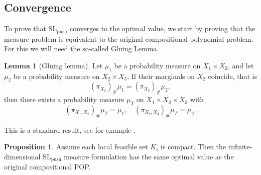 \documentclass[11pt,a4paper]{article}
\theoremstyle{definition}
\newtheorem{lemma}[theorem]{Lemma}
\newtheorem{proposition}[theorem]{Proposition}
\begin{document}
\subsection{Convergence}

To prove that $\mathrm{SL}_{\mathrm{push}}$ converges to the optimal value, we start by proving that the measure problem is equivalent to the original compositional polynomial problem. For this we will need the so-called Gluing Lemma.

\begin{lemma}[Gluing lemma]\label{lemma:gluing}
Let $\mu_1$ be a probability measure on $X_1\times X_2$, and let
$\mu_2$ be a probability measure on $X_2\times X_3$. If their marginals on $X_2$ coincide, that is
\[
(\pi_{X_2})_{\#}\mu_1 = (\pi_{X_2})_{\#}\mu_2,
\]
then there exists a probability measure $\mu_T$ on $X_1\times X_2\times X_3$ with
\[
(\pi_{X_1,X_2})_{\#}\mu_T = \mu_1,\quad (\pi_{X_2,X_3})_{\#}\mu_T = \mu_2.
\]
\end{lemma}

This is a standard result, see for example \cite[Lem. B.13, p.~308]{Lasserre2010}.

\begin{proposition}
Assume each local feasible set $K_i$ is compact. Then the infinite-dimensional $\mathrm{SL}_{\mathrm{push}}$ measure formulation has the same optimal value as the original compositional POP.
\label{prop:gluing}
\end{proposition}
\end{document}
